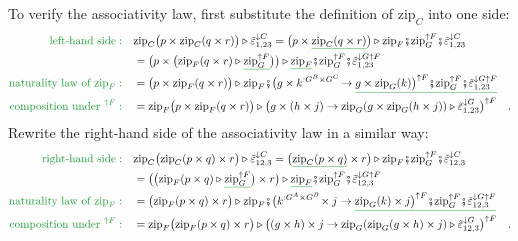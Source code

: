 To verify the associativity law, first substitute the definition of
$\text{zip}_{C}$ into one side:
\begin{align*}
{\color{greenunder}\text{left-hand side}:}\quad & \text{zip}_{C}\big(p\times\text{zip}_{C}(q\times r)\big)\triangleright\tilde{\varepsilon}_{1,23}^{\downarrow C}=\big(p\times\gunderline{\text{zip}_{C}(q\times r)}\big)\triangleright\text{zip}_{F}\bef\text{zip}_{G}^{\uparrow F}\bef\tilde{\varepsilon}_{1,23}^{\downarrow C}\\
 & =\big(p\times\big(\text{zip}_{F}(q\times r)\triangleright\gunderline{\text{zip}_{G}^{\uparrow F}}\big)\big)\triangleright\gunderline{\text{zip}_{F}}\bef\text{zip}_{G}^{\uparrow F}\bef\tilde{\varepsilon}_{1,23}^{\downarrow G\uparrow F}\\
{\color{greenunder}\text{naturality law of }\text{zip}_{F}:}\quad & =\big(p\times\text{zip}_{F}(q\times r)\big)\triangleright\text{zip}_{F}\bef\big(g\times k^{:G^{B}\times G^{C}}\!\rightarrow\gunderline{g\times\text{zip}_{G}(k)\big)^{\uparrow F}\bef\text{zip}_{G}^{\uparrow F}\bef\tilde{\varepsilon}_{1,23}^{\downarrow G\uparrow F}}\\
{\color{greenunder}\text{composition under }^{\uparrow F}:}\quad & =\text{zip}_{F}\big(p\times\text{zip}_{F}(q\times r)\big)\triangleright\big(g\times(h\times j)\rightarrow\text{zip}_{G}(g\times\text{zip}_{G}(h\times j))\triangleright\tilde{\varepsilon}_{1,23}^{\downarrow G}\big)^{\uparrow F}\quad.
\end{align*}
Rewrite the right-hand side of the associativity law in a similar
way:
\begin{align*}
{\color{greenunder}\text{right-hand side}:}\quad & \text{zip}_{C}\big(\text{zip}_{C}(p\times q)\times r\big)\triangleright\tilde{\varepsilon}_{12,3}^{\downarrow C}=\big(\gunderline{\text{zip}_{C}(p\times q)}\times r\big)\triangleright\text{zip}_{F}\bef\text{zip}_{G}^{\uparrow F}\bef\tilde{\varepsilon}_{12,3}^{\downarrow C}\\
 & =\big(\big(\text{zip}_{F}(p\times q)\triangleright\gunderline{\text{zip}_{G}^{\uparrow F}}\big)\times r\big)\triangleright\gunderline{\text{zip}_{F}}\bef\text{zip}_{G}^{\uparrow F}\bef\tilde{\varepsilon}_{12,3}^{\downarrow G\uparrow F}\\
{\color{greenunder}\text{naturality law of }\text{zip}_{F}:}\quad & =\big(\text{zip}_{F}(p\times q)\times r\big)\triangleright\text{zip}_{F}\bef\big(k^{:G^{A}\times G^{B}}\!\times j\rightarrow\gunderline{\text{zip}_{G}(k)\times j\big)^{\uparrow F}\bef\text{zip}_{G}^{\uparrow F}\bef\tilde{\varepsilon}_{12,3}^{\downarrow G\uparrow F}}\\
{\color{greenunder}\text{composition under }^{\uparrow F}:}\quad & =\text{zip}_{F}\big(\text{zip}_{F}(p\times q)\times r\big)\triangleright\big((g\times h)\times j\rightarrow\text{zip}_{G}(\text{zip}_{G}(g\times h)\times j)\triangleright\tilde{\varepsilon}_{12,3}^{\downarrow G}\big)^{\uparrow F}\quad.
\end{align*}
